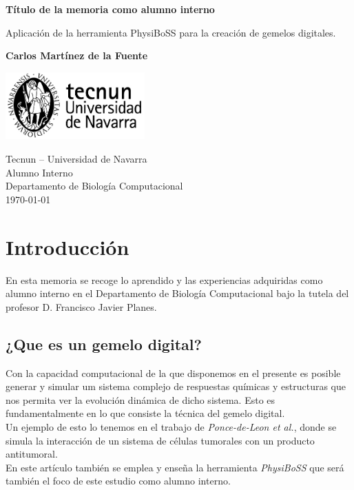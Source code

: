 \documentclass[11pt,a4paper]{article}
\begin{document}
	\begin{titlepage}
		\begin{center}
			\vspace*{1cm}
			
			\Huge
			\textbf{Título de la memoria como alumno interno}
			
			\vspace{0.5cm}
			\LARGE
			Aplicación de la herramienta PhysiBoSS para la creación de gemelos digitales.
			
			\vspace{1.5cm}
			
			\textbf{Carlos Mart\'inez de la Fuente}
			
			\vfill
			
			
			
			\vspace{0.8cm}
			
			\includegraphics[width=0.4\textwidth]{Sello tecnun negro.jpg}
			
			\vspace{0.8cm}
			\Large
			Tecnun \--- Universidad de Navarra\\
			Alumno Interno\\
			Departamento de Biología Computacional\\
			\today
			
		\end{center}
	\end{titlepage}
	\tableofcontents
	\newpage
	\section{Introducción}
	En esta memoria se recoge lo aprendido y las experiencias adquiridas como alumno interno en el Departamento de Biología Computacional bajo la tutela del profesor D. Francisco Javier Planes.
	
	\subsection{¿Que es un gemelo digital?}
	Con la capacidad computacional de la que disponemos en el presente es posible generar y simular um sistema complejo de respuestas químicas y estructuras que nos permita ver la evolución dinámica de dicho sistema. Esto es fundamentalmente en lo que consiste la técnica del gemelo digital.
	\\Un ejemplo de esto lo tenemos en el trabajo de \textit{Ponce-de-Leon et al.}\supercite{physiboss2}, donde se simula la interacción de un sistema de células tumorales con un producto antitumoral.
	\\En este artículo\supercite{physiboss2} también se emplea y enseña la herramienta \textit{PhysiBoSS}\supercite{gitrepo} que será también el foco de este estudio como alumno interno.
	
\end{document}
